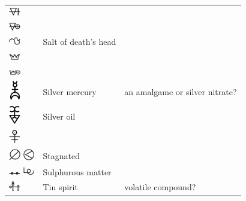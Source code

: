 \documentclass[british,final,landscape]{scrartcl}
\begin{document}
\begin{refsection}
\begin{supertabular}{p{0.3\textwidth}p{0.34\textwidth}p{0.34\textwidth}}
   \includegraphics[width=5mm]{Unknown/SaltAcido} &  & \\
   \includegraphics[width=5mm]{Unknown/SaltAlkali} &  & \\
   \includegraphics[width=5mm]{Unknown/SaltDeadsHead}  & Salt of death’s head & \\
   \includegraphics[width=5mm]{Unknown/SaltMetallicusAcido} &  & \\
   \includegraphics[width=5mm]{Unknown/SaltMetallicusAlcali} &  & \\
   \includegraphics[width=5mm]{Unknown/SilverMercury} & Silver mercury & an amalgame or silver nitrate? \\
   \includegraphics[width=5mm]{Unknown/SilverOil} & Silver oil &  \\
   \includegraphics[width=5mm]{Unknown/SolMercurii} &  & \\
   \includegraphics[width=5mm]{Unknown/Stagnated} \includegraphics[width=5mm]{Unknown/Stagnated2} & Stagnated & \\
   \includegraphics[width=5mm]{Unknown/SulphurousMatter} \includegraphics[width=5mm]{Unknown/SulphurousMatter2} & Sulphurous matter & \\
   \includegraphics[width=5mm]{Unknown/TinSpirit} & Tin spirit & volatile compound? \\
  \end{supertabular}


\end{refsection}
\end{document}
